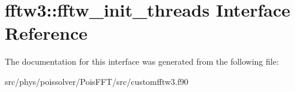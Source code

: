 \hypertarget{interfacefftw3_1_1fftw__init__threads}{}\section{fftw3\+:\+:fftw\+\_\+init\+\_\+threads Interface Reference}
\label{interfacefftw3_1_1fftw__init__threads}


The documentation for this interface was generated from the following file\+:\begin{DoxyCompactItemize}
\item 
src/phys/poissolver/\+Pois\+F\+F\+T/src/customfftw3.\+f90\end{DoxyCompactItemize}
